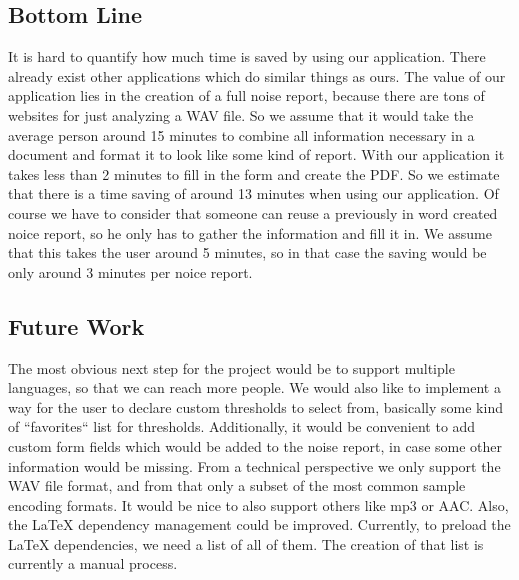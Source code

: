 \subsection{Bottom Line}
It is hard to quantify how much time is saved by using our application. There already exist other applications which do similar things as ours.
The value of our application lies in the creation of a full noise report, because there are tons of websites for just analyzing a WAV file.
So we assume that it would take the average person around 15 minutes to combine all information necessary in a document and format it to look like some kind of report.
With our application it takes less than 2 minutes to fill in the form and create the PDF. So we estimate that there is a time saving of around 13 minutes when using our application. Of course we have to consider that someone can reuse a previously in word created noice report, so he only has to gather the information and fill it in. We assume that this takes the user around 5 minutes, so in that case the saving would be only around 3 minutes per noice report.

\subsection{Future Work}
The most obvious next step for the project would be to support multiple languages, so that we can reach more people. We would also like to implement a way
for the user to declare custom thresholds to select from, basically some kind of ``favorites`` list for thresholds. Additionally, it would be convenient to add
custom form fields which would be added to the noise report, in case some other information would be missing. From a technical perspective we only support the WAV
file format, and from that only a subset of the most common sample encoding formats. It would be nice to also support others like mp3 or AAC. Also, the LaTeX dependency
management could be improved. Currently, to preload the LaTeX dependencies, we need a list of all of them. The creation of that list is currently a manual process.